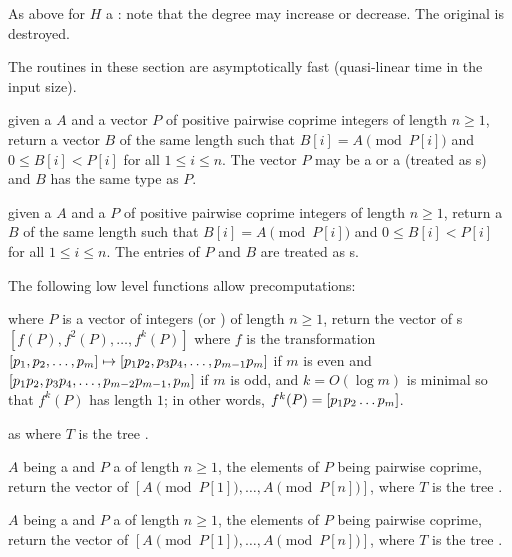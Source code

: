 

As above for $H$ a : note that the degree may increase or decrease.
The original  is destroyed.




The routines in these section are asymptotically fast (quasi-linear time in
the input size).

 given a  $A$ and a vector $P$ of
positive pairwise coprime integers of length $n\ge 1$, return a vector $B$ of
the same length such that $B[i] = A\pmod{P[i]}$ and $0\leq B[i] < P[i]$ for
all $1\leq i\leq n$. The vector $P$ may be a  or a 
(treated as s) and $B$ has the same type as $P$.

 given a  $A$ and a 
$P$ of positive pairwise coprime integers of length $n\ge 1$, return a
 $B$ of the same length such that $B[i]=A\pmod{P[i]}$ and
$0\leq B[i] < P[i]$ for all $1\leq i\leq n$. The entries of $P$ and $B$ are
treated as s.

The following low level functions allow precomputations:

 where $P$ is a vector of integers (or
) of length $n\ge 1$, return the vector of s
$[f(P),f^2(P),\ldots,f^k(P)]$ where $f$ is the transformation
$[p_1,p_2,\ldots,p_m] \mapsto [p_1\*p_2,p_3\*p_4,\ldots,p_{m-1}\*p_m]$ if $m$
is even and $[p_1\*p_2,p_3\*p_4,\ldots,p_{m-2}\*p_{m-1},p_m]$ if $m$ is odd,
and $k = O(\log m)$ is minimal so that $f^k(P)$ has length $1$; in other
words, $f^k(P) = [p_1\*p_2\*\ldots\*p_m]$.

as  where $T$ is the tree .

 $A$ being a 
and $P$ a  of length $n\ge 1$, the elements of $P$ being
pairwise coprime, return the vector of 
$[A \pmod{P[1]},\ldots,A \pmod{P[n]}]$,
where $T$ is the tree .

 $A$ being a 
and $P$ a  of length $n\ge 1$, the elements of $P$ being
pairwise coprime, return the vector of 
$[A \pmod{P[1]},\ldots,A \pmod{P[n]}]$,
where $T$ is the tree .

